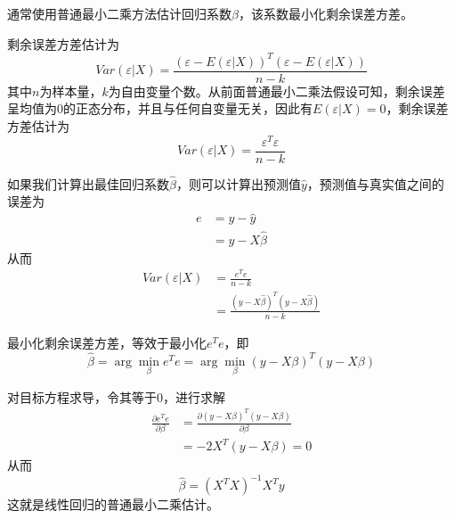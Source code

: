 通常使用普通最小二乘方法估计回归系数$\beta$，该系数最小化剩余误差方差。

剩余误差方差估计为
\begin{equation}
    Var(\varepsilon | X) = \frac{\left(\varepsilon - E(\varepsilon | X)\right)^T\left(\varepsilon - E(\varepsilon | X)\right)}{n-k}
\end{equation}
其中$n$为样本量，$k$为自由变量个数。从前面普通最小二乘法假设可知，剩余误差呈均值为0的正态分布，并且与任何自变量无关，因此有$E(\varepsilon | X) = 0$，剩余误差方差估计为
\begin{equation}
    Var(\varepsilon | X) = \frac{\varepsilon^T\varepsilon}{n-k}
\end{equation}

如果我们计算出最佳回归系数$\hat{\beta}$，则可以计算出预测值$\hat{y}$，预测值与真实值之间的误差为
\begin{equation}
    \begin{aligned}
        e & = y - \hat{y}      \\
          & = y - X\hat{\beta}
    \end{aligned}
\end{equation}
从而
\begin{equation}
    \begin{aligned}
        Var(\varepsilon | X) & = \frac{e^Te}{n-k}                                   \\
                             & = \frac{(y - X\hat{\beta})^T(y - X\hat{\beta})}{n-k}
    \end{aligned}
\end{equation}

最小化剩余误差方差，等效于最小化$e^Te$，即
\begin{equation}
    \hat{\beta} = \arg \min_{\beta} e^Te = \arg \min_{\beta} (y - X\beta)^T(y - X\beta)
\end{equation}

对目标方程求导，令其等于0，进行求解
\begin{equation}
    \begin{aligned}
        \frac{\partial e^Te}{\partial \beta} & = \frac{\partial (y - X\beta)^T(y - X\beta)}{\partial \beta} \\
                                             & = -2X^T(y - X\beta) = 0
    \end{aligned}
\end{equation}
从而
\begin{equation}
    \hat{\beta} = (X^TX)^{-1}X^Ty
\end{equation}
这就是线性回归的普通最小二乘估计。


